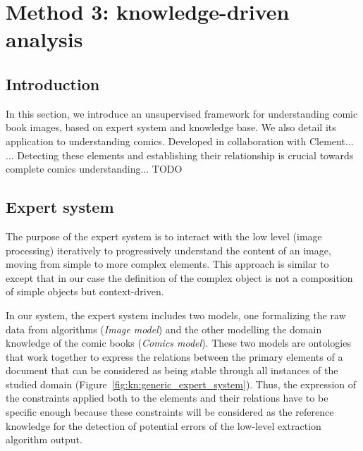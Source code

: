 \chapter{Method 3: knowledge-driven analysis}
\label{chap:knowledge}
\graphicspath{{./chapters/5-knowledge/figs/}}

\section{Introduction}
\label{sec:kn:introduction}

In this section, we introduce an unsupervised framework for understanding comic book images, based on expert system and knowledge base.
We also detail its application to understanding comics.
Developed in collaboration with Clement...
... Detecting these elements and establishing their relationship is crucial towards complete comics understanding...
TODO

\section{Expert system} %
\label{sec:kn:expert_system}

The purpose of the expert system is to interact with the low level (image processing) iteratively to progressively understand the content of an image, moving from simple to more complex elements.
This approach is similar to~\cite{Sciascio2011Structured} except that in our case the definition of the complex object is not a composition of simple objects but context-driven.

In our system, the expert system includes two models, one formalizing the raw data from algorithms (\emph{Image model}) and the other modelling the domain knowledge of the comic books (\emph{Comics model}).
These two models are ontologies that work together to
express the relations between the primary elements of a document that can be considered as being stable through all instances of the studied domain (Figure~\ref{fig:kn:generic_expert_system}).
Thus, the expression of the constraints applied both to the elements and their relations have to be specific enough because these constraints will be considered as the reference knowledge for the detection of potential errors of the low-level extraction algorithm output.

